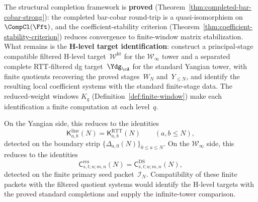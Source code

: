 \begin{conjecture}
\label{conj:v1-master-infinite-generator}
\ClaimStatusConjectured{}
The structural completion framework is \textbf{proved}
(Theorem~\ref{thm:completed-bar-cobar-strong}): the completed
bar-cobar round-trip is a quasi-isomorphism on
$\CompCl(\Fft)$, and the coefficient-stability criterion
(Theorem~\ref{thm:coefficient-stability-criterion}) reduces
convergence to finite-window matrix stabilization. What remains
is the \textbf{H-level target identification}: construct a
principal-stage compatible filtered H-level
target~$\mathcal{W}^{\mathrm{ht}}$ for the
$\mathcal{W}_\infty$ tower and a separated complete RTT-filtered dg
target~$\Ydg_{\cA}$ for the standard Yangian tower, with finite
quotients recovering the proved stages~$W_N$ and~$Y_{\le N}$,
and identify the resulting local coefficient systems with the
standard finite-stage data. The reduced-weight windows $K_q$
(Definition~\ref{def:finite-window}) make each identification
a finite computation at each level~$q$.

On the Yangian side, this reduces to the identities
\[
\mathsf{K}^{\mathrm{line}}_{a,b}(N)
=\mathsf{K}^{\mathrm{RTT}}_{a,b}(N)
\qquad (a,b\le N),
\]
detected on the boundary strip
$\{\Delta_{a,0}(N)\}_{0\le a\le N}$.
On the $\mathcal{W}_\infty$ side, this reduces to the identities
\[
\mathsf{C}^{\mathrm{res}}_{s,t;u;m,n}(N)
=\mathsf{C}^{\mathrm{DS}}_{s,t;u;m,n}(N),
\]
detected on the finite primary seed packet~$\mathcal{I}_N$.
Compatibility of these finite packets with the filtered quotient systems
would identify the H-level targets with the proved standard
completions and supply the infinite-tower comparison.
\end{conjecture}


